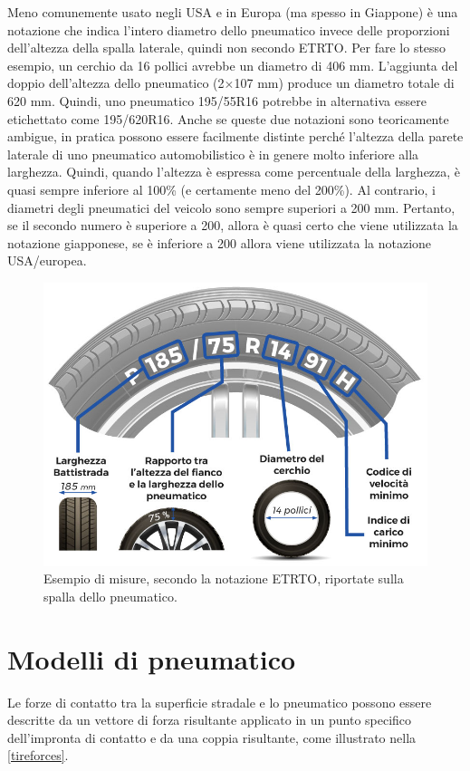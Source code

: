 Meno comunemente usato negli USA e in Europa (ma spesso in Giappone) è una notazione che indica l'intero diametro dello pneumatico invece delle proporzioni dell'altezza della spalla laterale, quindi non secondo \ac{ETRTO}. Per fare lo stesso esempio, un cerchio da 16 pollici avrebbe un diametro di 406 mm. L'aggiunta del doppio dell'altezza dello pneumatico (2$\times$107 mm) produce un diametro totale di 620 mm. Quindi, uno pneumatico 195/55R16 potrebbe in alternativa essere etichettato come 195/620R16. Anche se queste due notazioni sono teoricamente ambigue, in pratica possono essere facilmente distinte perché l'altezza della parete laterale di uno pneumatico automobilistico è in genere molto inferiore alla larghezza. Quindi, quando l'altezza è espressa come percentuale della larghezza, è quasi sempre inferiore al 100\% (e certamente meno del 200\%). Al contrario, i diametri degli pneumatici del veicolo sono sempre superiori a 200 mm. Pertanto, se il secondo numero è superiore a 200, allora è quasi certo che viene utilizzata la notazione giapponese, se è inferiore a 200 allora viene utilizzata la notazione USA/europea.

\begin{figure}[h]
	\centering
	\includegraphics[width=0.7\linewidth]{Figures/tire_measures}
	\caption{Esempio di misure, secondo la notazione ETRTO, riportate sulla spalla dello pneumatico.}
	\label{tiremeasures}
\end{figure}
%
\section{Modelli di pneumatico}
Le forze di contatto tra la superficie stradale e lo pneumatico possono essere descritte da un vettore di forza risultante applicato in un punto specifico dell'impronta di contatto e da una coppia risultante, come illustrato nella \figurename{  \ref{tireforces}}.

